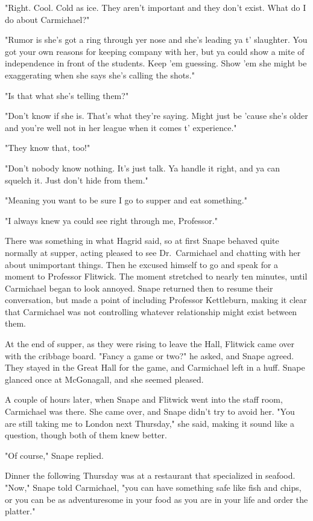 "Right. Cool. Cold as ice. They aren't important and they don't exist. What do I do about Carmichael?"

"Rumor is she's got a ring through yer nose and she's leading ya t' slaughter. You got your own reasons for keeping company with her, but ya could show a mite of independence in front of the students. Keep 'em guessing. Show 'em she might be exaggerating when she says she's calling the shots."

"Is that what she's telling them?"

"Don't know if she is. That's what they're saying. Might just be 'cause she's older and you're{\el} well{\el} not in her league when it comes t' experience."

"They know that, too!"

"Don't nobody know nothing. It's just talk. Ya handle it right, and ya can squelch it. Just don't hide from them."

"Meaning you want to be sure I go to supper and eat something."

"I always knew ya could see right through me, Professor."

There was something in what Hagrid said, so at first Snape behaved quite normally at supper, acting pleased to see Dr.~Carmichael and chatting with her about unimportant things. Then he excused himself to go and speak for a moment to Professor Flitwick. The moment stretched to nearly ten minutes, until Carmichael began to look annoyed. Snape returned then to resume their conversation, but made a point of including Professor Kettleburn, making it clear that Carmichael was not controlling whatever relationship might exist between them.

At the end of supper, as they were rising to leave the Hall, Flitwick came over with the cribbage board. "Fancy a game or two?" he asked, and Snape agreed. They stayed in the Great Hall for the game, and Carmichael left in a huff. Snape glanced once at McGonagall, and she seemed pleased.

A couple of hours later, when Snape and Flitwick went into the staff room, Carmichael was there. She came over, and Snape didn't try to avoid her. "You are still taking me to London next Thursday," she said, making it sound like a question, though both of them knew better.

"Of course," Snape replied.

Dinner the following Thursday was at a restaurant that specialized in seafood. "Now," Snape told Carmichael, "you can have something safe like fish and chips, or you can be as adventuresome in your food as you are in your life and order the platter."


